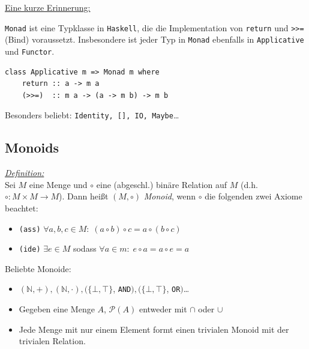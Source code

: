 \documentclass{beamer}
\begin{document}
\begin{frame}[fragile]

\underline{Eine kurze Erinnerung:}\bigskip

\texttt{Monad} ist eine Typklasse in \texttt{Haskell}, die die Implementation von \texttt{return} und \texttt{>>=} (Bind) voraussetzt. Insbesondere ist jeder Typ in \texttt{Monad} ebenfalls in \texttt{Applicative} und \texttt{Functor}.\bigskip

\begin{verbatim}
class Applicative m => Monad m where
    return :: a -> m a
    (>>=)  :: m a -> (a -> m b) -> m b
\end{verbatim}
\pause

Besonders beliebt: \texttt{Identity, [], IO, Maybe}\dots
\end{frame}

\subsection*{Monoids}

\begin{frame}
\underline{\emph{Definition:}}\\ Sei $M$ eine Menge und $\circ$ eine (abgeschl.) binäre Relation auf $M$ (d.h. $\circ : M \times M \to M$). Dann heißt $(M, \circ)$ \emph{Monoid}, wenn $\circ$ die folgenden zwei Axiome beachtet:

\begin{itemize}
\pause \item \texttt{(ass)} $\forall a,b,c \in M:\; (a \circ b) \circ c = a \circ (b \circ c)$
\pause \item \texttt{(ide)} $\exists e \in M$ sodass $\forall a \in m:\; e \circ a = a \circ e = a$
\end{itemize}
\pause\bigskip

Beliebte Monoide:
\begin{itemize}
\pause \item $(\mathbb{N}, +), (\mathbb{N}, \cdot), (\{\bot, \top\}$, \texttt{AND}$), (\{\bot, \top\}$, \texttt{OR}$)$\dots
\pause \item Gegeben eine Menge $A$, $\mathcal{P}(A)$ entweder mit $\cap$ oder $\cup$
\pause \item Jede Menge mit nur einem Element formt einen trivialen Monoid mit der trivialen Relation.
\end{itemize}

\end{frame}
\end{document}
